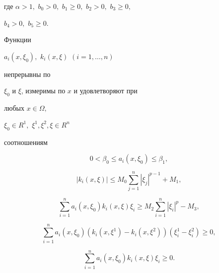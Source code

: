 где $ \alpha >1,$ $b_{0} >0,$ $b_{1}\ge  0,$ $b_{2}>0,$ $b_{3}\ge  0,$


$b_{4}> 0,$ $ b_{5} \ge  0 $.





  Функции


   $ a_{i}(x,\xi _{0}),$  $ k_{i}(x,\xi )$ $ ( i = 1,\dotsc, n) $


непрерывны по


$\xi _{0} $ и $\xi $, измеримы по $x $ и удовлетворяют при


любых $ x \in \Omega,$ 


$\xi_{0}\in R^{1},$ $\xi^{1}, \xi^{2}, \xi \in R^{n} $


соотношениям


\begin{equation}


0 < \beta_{0} \le  a_{i}(x,\xi _{0}) \le  \beta_{1},


\label{(1.6)}


\end{equation}


%


\begin{equation}


|k_{i}(x,\xi )| \le M_{0}\sum^{n}_{j=1}| \xi _{j}| ^{p-1}+M_{1},


\label{(1.7)}


\end{equation}


%


\begin{equation}


\sum^{n}_{i=1}a_{i}(x,\xi _{0})k_{i}(x,\xi )\xi _{i} \ge M_{2}


\sum^{n}_{i=1} | \xi _{i}| ^{p}-M_{3},


\label{(1.8)}


\end{equation}


%


\begin{equation}


\sum^{n}_{i=1} a_{i}(x,\xi _{0})(k_{i}(x,\xi ^{1})-k_{i}(x,\xi ^{2}))


(\xi ^{1}_{i}-\xi ^{2}_{i})\ge  0,


\label{(1.9)}


\end{equation}


%


\begin{equation}


\sum^{n}_{i=1} a_{i}(x,\xi_0 ) k_i(x,\xi)\xi_i \ge 0. \label{(1.10)}


\end{equation}


